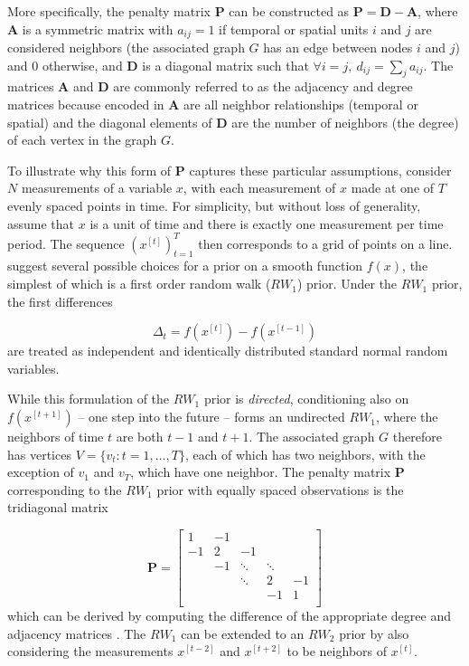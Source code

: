 More specifically, the penalty matrix $\mathbf{P}$ can be constructed as  $\mathbf{P} = \mathbf{D} - \mathbf{A}$, where $\mathbf{A}$ is a symmetric matrix with $a_{ij} = 1$ if temporal or spatial units $i$ and $j$ are considered neighbors (the associated graph $G$ has an edge between nodes $i$ and $j$) and 0 otherwise, and $\mathbf{D}$ is a diagonal matrix such that $\forall i = j, \: d_{ij} = \sum_j a_{ij}$. The matrices $\mathbf{A}$ and $\mathbf{D}$ are commonly referred to as the adjacency and degree matrices because encoded in $\mathbf{A}$ are all neighbor relationships (temporal or spatial) and the diagonal elements of $\mathbf{D}$ are the number of neighbors (the degree) of each vertex in the graph $G$.

To illustrate why this form of $\mathbf{P}$ captures these particular assumptions, consider $N$ measurements of a variable $x$, with each measurement of $x$ made at one of $T$ evenly spaced points in time. For simplicity, but without loss of generality,  assume that $x$ is a unit of time and there is exactly one measurement per time period.  The sequence $(x^{[t]})_{t=1}^T$ then corresponds to a grid of points on a line.   suggest several possible choices for a prior on a smooth function $f(x)$, the simplest of which is a first order random walk ($RW_1$) prior.  Under the $RW_1$ prior, the first differences

{\singlespacing
$$\Delta_t = f(x^{[t]}) - f(x^{[t-1]})$$
}
%
\noindent are treated as independent and identically distributed standard normal random variables. 

While this formulation of the $RW_1$ prior is {\it directed}, conditioning also on $f(x^{[t+1]})$ -- one step into the future -- forms an undirected $RW_1$, where the neighbors of time $t$ are both $t-1$ and $t+1$.  The associated graph $G$ therefore has vertices $V=\{v_t : t=1,\dots,T\}$, each of which has two neighbors, with the exception of $v_1$ and $v_T$, which have one neighbor. The penalty matrix $\mathbf{P}$ corresponding to the $RW_1$ prior with equally spaced observations is the tridiagonal matrix

{\singlespacing
$$ \mathbf{P} = 
\begin{bmatrix}
1  	& -1 	& 		& 	& \\
-1  	& 2 	& -1 		& 	& \\
  	& -1 	& \ddots 	& \ddots	& \\
  	&  	& \ddots 	& 2 	& -1\\
  	&  	& 		& -1 	& 1\\
\end{bmatrix}
$$
}
%
\noindent which can be derived by computing the difference of the appropriate degree and adjacency matrices . The $RW_1$  can be extended to an $RW_2$ prior by also considering the measurements $x^{[t-2]}$  and $x^{[t+2]}$ to be neighbors of $x^{[t]}$. 

